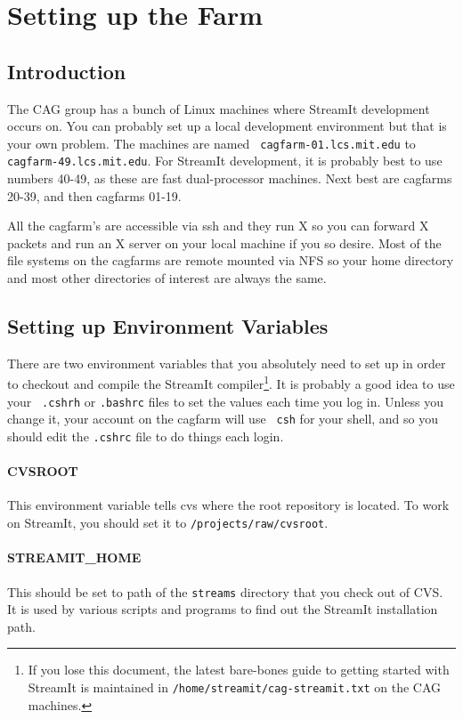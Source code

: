 \section{Setting up the Farm}

\subsection{Introduction}
The CAG group has a bunch of Linux machines where StreamIt development
occurs on. You can probably set up a local development environment but
that is your own problem. The machines are named {\tt
cagfarm-01.lcs.mit.edu} to {\tt cagfarm-49.lcs.mit.edu}. For StreamIt
development, it is probably best to use numbers 40-49, as these are
fast dual-processor machines.  Next best are cagfarms 20-39, and then
cagfarms 01-19.

All the cagfarm's are accessible via ssh and they run X so you can
forward X packets and run an X server on your local machine if you so
desire. Most of the file systems on the cagfarms are remote mounted
via NFS so your home directory and most other directories of interest
are always the same.

\subsection{Setting up Environment Variables}
There are two environment variables that you absolutely need to set up
in order to checkout and compile the StreamIt compiler\footnote{If you
lose this document, the latest bare-bones guide to getting started
with StreamIt is maintained in {\tt /home/streamit/cag-streamit.txt}
on the CAG machines.}. It is probably a good idea to use your {\tt
.cshrh} or {\tt .bashrc} files to set the values each time you log
in. Unless you change it, your account on the cagfarm will use {\tt
csh} for your shell, and so you should edit the {\tt .cshrc} file to
do things each login.

\paragraph{CVSROOT}
This environment variable tells cvs where the root repository is 
located. To work on StreamIt, you should set it to 
{\tt /projects/raw/cvsroot}.

\paragraph{STREAMIT\_HOME}
This should be set to path of the {\tt streams} directory that 
you check out of CVS. It is used by various scripts and programs
to find out the StreamIt installation path.

